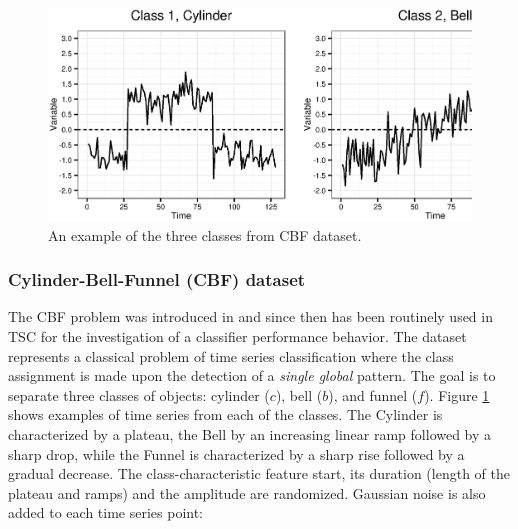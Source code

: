 \begin{figure}[t]
   \centering
   \includegraphics[width=140mm]{figures/cbf.ps}
   \caption{An example of the three classes from CBF dataset.}
   \label{fig:cbf}
\end{figure}

\subsubsection{Cylinder-Bell-Funnel (CBF) dataset}
The CBF problem was introduced in \cite{cbf} and since then has been routinely used in TSC for the investigation 
of a classifier performance behavior.
The dataset represents a classical problem of time series classification where the class assignment is made upon the 
detection of a \textit{single global} pattern. 
The goal is to separate three classes of objects: cylinder ($c$), bell ($b$), and funnel ($f$).  Figure \ref{fig:cbf} 
shows examples of time series from each of the classes. 
The Cylinder is characterized by a plateau, the Bell by an increasing linear ramp followed by a sharp drop, 
while the Funnel is characterized by a sharp rise followed by a gradual decrease. 
The class-characteristic feature start, its duration (length of the plateau and ramps) and the amplitude are randomized. 
Gaussian noise is also added to each time series point:

